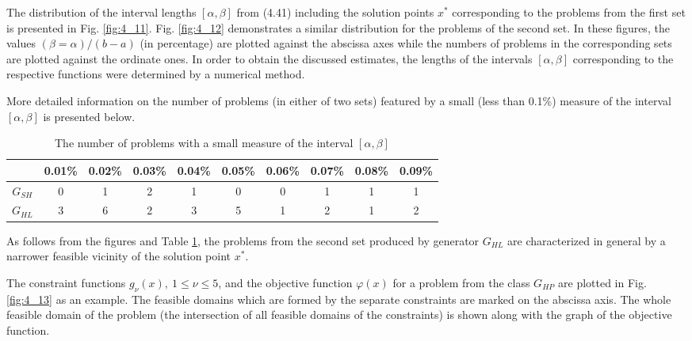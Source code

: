 The distribution of the interval lengths $[\alpha,\beta]$ from (4.41) including the solution points $x^*$ corresponding to the problems from the first set is presented in Fig. \ref{fig:4_11}. Fig. \ref{fig:4_12} demonstrates a similar distribution for the problems of the second set. In these figures, the values $(\beta=\alpha)/(b-a)$ (in percentage) are plotted against the abscissa axes while the numbers of problems in the corresponding sets are plotted against the ordinate ones. In order to obtain the discussed estimates, the lengths of the intervals $[\alpha,\beta]$ corresponding to the respective functions were determined by a numerical method.

More detailed information on the number of problems (in either of two sets) featured by a small (less than 0.1\%) measure of the interval $[\alpha,\beta]$ is presented below.

\begin{table}
  \caption{The number of problems with a small measure of the interval $[\alpha,\beta]$}
\begin{center}
  \label{tab4:exp_results2}
  \begin{tabular}{cccccccccc}
    \hline
     & 0.01\% & 0.02\% & 0.03\% & 0.04\% & 0.05\% & 0.06\% & 0.07\% & 0.08\% & 0.09\% \\ \hline
    $G_{SH}$ & 0 & 1 & 2 & 1 & 0 & 0 & 1 & 1 & 1  \\ 
    $G_{HL}$ & 3 & 6 & 2 & 3 & 5 & 1 & 2 & 1 & 2 \\ \hline
  \end{tabular}
\end{center}
\end{table}

As follows from the figures and Table \ref{tab4:exp_results2}, the problems from the second set produced by generator $G_{HL}$ are characterized in general by a narrower feasible vicinity of the solution point $x^*$.

The constraint functions $g_\nu( x ),\: 1 \le\nu\le 5$, and the objective function $\varphi (x)$ for a problem from the class $G_{HP}$ are plotted in Fig. \ref{fig:4_13} as an example. The feasible domains which are formed by the separate constraints are marked on the abscissa axis. The whole feasible domain of the problem (the intersection of all feasible domains of the constraints) is shown along with the graph of the objective function.

